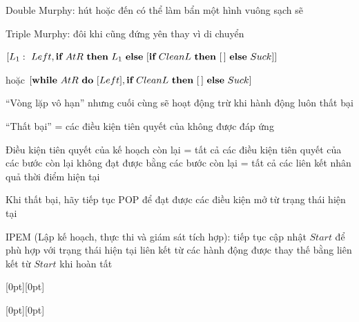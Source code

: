 \documentclass{article}
\newcommand{\condstep}[3]{\mbf{if}~#1~\mbf{then}~#2~\mbf{else}~#3}
\newcommand{\whilestep}[2]{\mbf{while}~#1~\mbf{do}~#2}
\newcommand{\noplan}{\emptylist}
\begin{document}
\begin{huge}
Double Murphy: hút hoặc đến có thể làm bẩn một hình vuông sạch sẽ

\vspace*{0.2in}

\textwidth
{}


Triple Murphy: đôi khi cũng đứng yên thay vì di chuyển

\vspace*{0.2in}

\textwidth
{}

$[L_1:\ Left, \condstep{AtR}{L_1}{[\condstep{CleanL}{\noplan}{Suck}]}]$

hoặc $[\whilestep{AtR}{[Left]}, \condstep{CleanL}{\noplan}{Suck}]$

``Vòng lặp vô hạn'' nhưng cuối cùng sẽ hoạt động trừ khi hành động luôn thất bại


``Thất bại'' = các điều kiện tiên quyết của  không được đáp ứng

Điều kiện tiên quyết của kế hoạch còn lại\nl
= tất cả các điều kiện tiên quyết của các bước còn lại không đạt được bằng các bước còn lại\nl
= tất cả các liên kết nhân quả  thời điểm hiện tại

Khi thất bại, hãy tiếp tục POP để đạt được các điều kiện mở từ trạng thái hiện tại

IPEM (Lập kế hoạch, thực thi và giám sát tích hợp):\nl
  tiếp tục cập nhật $Start$ để phù hợp với trạng thái hiện tại \nl
  liên kết từ các hành động được thay thế bằng liên kết từ $Start$ khi hoàn tất


\vspace*{0.2in}

\centerline{\raisebox{-0.9\textheight}[0pt][0pt]{\textheight{}}}



\vspace*{0.2in}

\centerline{\raisebox{-0.9\textheight}[0pt][0pt]{\textheight{}}}



\end{huge}
\end{document}

